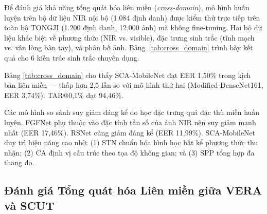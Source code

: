 \documentclass[12pt,a4paper]{article}
\begin{document}
Để đánh giá khả năng tổng quát hóa liên miền (\textit{cross-domain}), mô hình huấn luyện trên bộ dữ liệu NIR nội bộ (1.084 định danh) được kiểm thử trực tiếp trên toàn bộ TONGJI (1.200 định danh, 12.000 ảnh) mà không fine-tuning. Hai bộ dữ liệu khác biệt về phương thức (NIR vs. visible), đặc trưng sinh trắc (tĩnh mạch vs. vân lòng bàn tay), và phân bố ảnh. Bảng~\ref{tab:cross_domain} trình bày kết quả cho 6 kiến trúc sinh trắc chuyên dụng.

\begin{table}[H]
\caption{Đánh giá tổng quát hóa liên miền (cross-domain): huấn luyện trên bộ dữ liệu tĩnh mạch tự thu thập, kiểm thử trên toàn bộ TONGJI (1.200 định danh).}
\begin{center}
\label{tab:cross_domain}
\end{center}
\end{table}

Bảng \ref{tab:cross_domain} cho thấy SCA-MobileNet đạt EER 1,50\% trong kịch bản liên miền --- thấp hơn 2,5 lần so với mô hình thứ hai (Modified-DenseNet161, EER 3,74\%). TAR@0,1\% đạt 94,46\%.

Các mô hình so sánh suy giảm đáng kể do học đặc trưng quá đặc thù miền huấn luyện. FGFNet phụ thuộc vào đặc tính tần số của ảnh NIR nên suy giảm mạnh nhất (EER 17,46\%). RSNet cũng giảm đáng kể (EER 11,99\%). SCA-MobileNet duy trì hiệu năng cao nhờ: (1) STN chuẩn hóa hình học bất kể phương thức thu nhận; (2) CA định vị cấu trúc theo tọa độ không gian; và (3) SPP tổng hợp đa thang đo.

\subsection{Đánh giá Tổng quát hóa Liên miền giữa VERA và SCUT}
\end{document}
